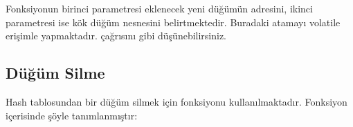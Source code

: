 \documentclass[a4paper,10pt,turkish]{sphinxmanual}
\begin{document}
\begin{sphinxVerbatim}[commandchars=\\\{\}]
\end{sphinxVerbatim}

\sphinxAtStartPar
Fonksiyonun birinci parametresi eklenecek yeni düğümün adresini, ikinci parametresi ise kök
düğüm nesnesini belirtmektedir. Buradaki  atamayı volatile erişimle
yapmaktadır.  çağrısını  gibi düşünebilirsiniz.


\subsection{Düğüm Silme}
\label{\detokenize{kernellinkedlistandhashtable:id1}}
\sphinxAtStartPar
Hash tablosundan bir düğüm silmek için  fonksiyonu kullanılmaktadır. Fonksiyon
 içerisinde şöyle tanımlanmıştır:
\end{document}
